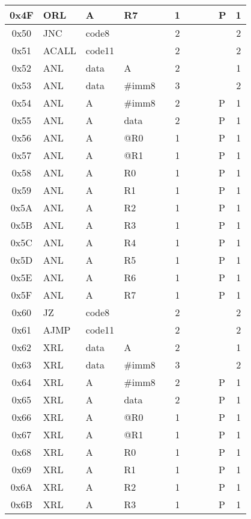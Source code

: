 \documentclass[a4paper,twoside,12pt]{book}
\begin{document}
{\begin{longtable}{|c|l|lll|c|llll|c|}
		0x4F	& ORL	& A	& R7	&	& 1	&	&	&	& P	& 1	\\\hline
		0x50	& JNC	& code8	&	&	& 2	&	&	&	&	& 2	\\\hline
		0x51	& ACALL	& code11&	&	& 2	&	&	&	&	& 2	\\\hline
		0x52	& ANL	& data	& A	&	& 2	&	&	&	&	& 1	\\\hline
		0x53	& ANL	& data	& \#imm8&	& 3	&	&	&	&	& 2	\\\hline
		0x54	& ANL	& A	& \#imm8&	& 2	&	&	&	& P	& 1	\\\hline
		0x55	& ANL	& A	& data	&	& 2	&	&	&	& P	& 1	\\\hline
		0x56	& ANL	& A	& @R0	&	& 1	&	&	&	& P	& 1	\\\hline
		0x57	& ANL	& A	& @R1	&	& 1	&	&	&	& P	& 1	\\\hline
		0x58	& ANL	& A	& R0	&	& 1	&	&	&	& P	& 1	\\\hline
		0x59	& ANL	& A	& R1	&	& 1	&	&	&	& P	& 1	\\\hline
		0x5A	& ANL	& A	& R2	&	& 1	&	&	&	& P	& 1	\\\hline
		0x5B	& ANL	& A	& R3	&	& 1	&	&	&	& P	& 1	\\\hline
		0x5C	& ANL	& A	& R4	&	& 1	&	&	&	& P	& 1	\\\hline
		0x5D	& ANL	& A	& R5	&	& 1	&	&	&	& P	& 1	\\\hline
		0x5E	& ANL	& A	& R6	&	& 1	&	&	&	& P	& 1	\\\hline
		0x5F	& ANL	& A	& R7	&	& 1	&	&	&	& P	& 1	\\\hline
		0x60	& JZ	& code8	&	&	& 2	&	&	&	&	& 2	\\\hline
		0x61	& AJMP	& code11&	&	& 2	&	&	&	&	& 2	\\\hline
		0x62	& XRL	& data	& A	&	& 2	&	&	&	&	& 1	\\\hline
		0x63	& XRL	& data	& \#imm8&	& 3	&	&	&	&	& 2	\\\hline
		0x64	& XRL	& A	& \#imm8&	& 2	&	&	&	& P	& 1	\\\hline
		0x65	& XRL	& A	& data	&	& 2	&	&	&	& P	& 1	\\\hline
		0x66	& XRL	& A	& @R0	&	& 1	&	&	&	& P	& 1	\\\hline
		0x67	& XRL	& A	& @R1	&	& 1	&	&	&	& P	& 1	\\\hline
		0x68	& XRL	& A	& R0	&	& 1	&	&	&	& P	& 1	\\\hline
		0x69	& XRL	& A	& R1	&	& 1	&	&	&	& P	& 1	\\\hline
		0x6A	& XRL	& A	& R2	&	& 1	&	&	&	& P	& 1	\\\hline
		0x6B	& XRL	& A	& R3	&	& 1	&	&	&	& P	& 1	\\\hline

\end{longtable}}
\end{document}
